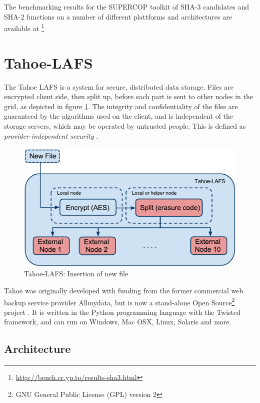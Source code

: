\documentclass[english,12pt,a4paper]{book}
\begin{document}
The benchmarking results for the \ac{SUPERCOP} toolkit of \ac{SHA}-3 candidates
and \ac{SHA}-2 functions on a number of different plattforms and architectures 
are available at
\footnote{\url{http://bench.cr.yp.to/results-sha3.html}}

\section{Tahoe-LAFS}

The Tahoe \ac{LAFS} is a system for secure,
distributed data storage. Files are encrypted client side, then
split up, before each part is sent to other nodes in the grid, as depicted in
figure \ref{fig:tahoeinsertion}. The integrity and confidentiality of the files
are guaranteed by the algorithms used on the client, and is independent of the
storage servers, which may be operated by untrusted people. This is defined as
\emph{provider-independent security} \cite{t_tahoe}.

\begin{figure}[h!]
    \centering
    \includegraphics[width=0.9\columnwidth]{Tahoe-newfile.pdf}
    \caption{Tahoe-LAFS: Insertion of new file}
    \label{fig:tahoeinsertion}
\end{figure}

Tahoe was originally developed with funding from the former commercial web
backup service provider Allmydata, but is now a stand-alone Open
Source\footnote{GNU General Public License (GPL) version 2} project
\cite{t_ars}.  It is written in the Python programming language with the Twisted
framework, and can run on Windows, Mac OSX, Linux, Solaris and more.

\subsection{Architecture}
\end{document}
